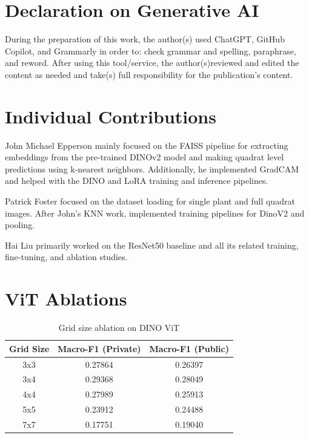 \documentclass[conference]{IEEEtran}
\begin{document}
\section{Declaration on Generative AI}
During the preparation of this work, the author(s) used ChatGPT, GitHub Copilot, and Grammarly in order to: check grammar and spelling, paraphrase, and reword. After using this tool/service, the author(s)reviewed and edited the content as needed and take(s) full responsibility for the publication’s content.

\section{Individual Contributions}

John Michael Epperson mainly focused on the FAISS pipeline for extracting embeddings from the pre-trained DINOv2 model and making quadrat level predictions using k-nearest neighbors. Additionally, he implemented GradCAM and helped with the DINO and LoRA training and inference pipelines.

Patrick Foster focused on the dataset loading for single plant and full quadrat images. After John's KNN work, implemented training pipelines for DinoV2 and pooling.

Hai Liu primarily worked on the ResNet50 baseline and all its related training, fine-tuning, and ablation studies.




\appendix

\section{ViT Ablations}

\begin{table}[H]
\centering
\caption{Grid size ablation on DINO ViT}
\label{tab:baseline-dino_all}
\small
\begin{tabular}{@{}ccc@{}}
\toprule
\textbf{Grid Size} & \textbf{Macro-F1 (Private)} & \textbf{Macro-F1 (Public)} \\ \midrule
3x3                & 0.27864                     & 0.26397                    \\
3x4                & 0.29368                     & 0.28049                    \\
4x4                & 0.27989                     & 0.25913                    \\
5x5                & 0.23912                     & 0.24488                    \\
7x7                & 0.17751                     & 0.19040                    \\ \bottomrule
\end{tabular}
\end{table}
\end{document}
